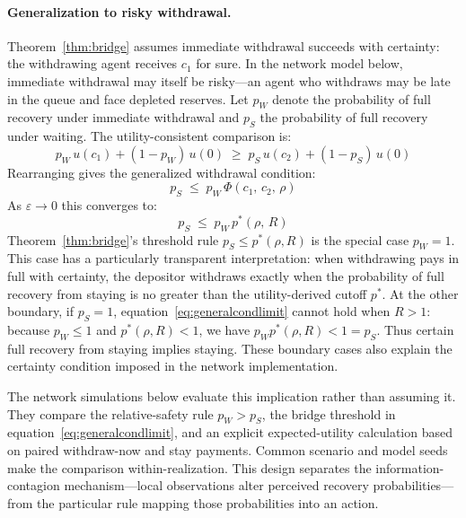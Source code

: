 \documentclass[12pt]{article}\usepackage[]{graphicx}\usepackage[]{xcolor}
\begin{document}
\paragraph{Generalization to risky withdrawal.} Theorem~\ref{thm:bridge}
assumes immediate withdrawal succeeds with certainty: the withdrawing agent receives $c_1$ for sure.
In the network model below, immediate withdrawal may itself be risky---an agent who withdraws may be late in the queue and face depleted reserves.
Let $p_W$ denote the probability of full recovery under immediate withdrawal and $p_S$ the probability of full recovery under waiting.
The utility-consistent comparison is:
%
\begin{equation}
  p_W\,u(c_1) + (1-p_W)\,u(0)
  \;\geq\;
  p_S\,u(c_2) + (1-p_S)\,u(0)
  \label{eq:generalbridge}
\end{equation}
%
Rearranging gives the generalized withdrawal condition:
%
\begin{equation}
  p_S \;\leq\; p_W\,\Phi(c_1,\,c_2,\,\rho)
  \label{eq:generalcond}
\end{equation}
%
As $\varepsilon \to 0$ this converges to:
%
\begin{equation}
  p_S \;\leq\; p_W\,p^*(\rho,\,R)
  \label{eq:generalcondlimit}
\end{equation}
%
Theorem~\ref{thm:bridge}'s threshold rule $p_S \leq p^*(\rho,R)$ is the special case $p_W = 1$.
This case has a particularly transparent interpretation: when withdrawing pays in full with certainty, the depositor withdraws exactly when the probability of full recovery from staying is no greater than the utility-derived cutoff $p^*$.
At the other boundary, if $p_S=1$, equation~\eqref{eq:generalcondlimit} cannot hold when $R>1$: because $p_W\leq1$ and $p^*(\rho,R)<1$, we have $p_Wp^*(\rho,R)<1=p_S$.
Thus certain full recovery from staying implies staying.
These boundary cases also explain the certainty condition imposed in the network implementation.

The network simulations below evaluate this implication rather than assuming it.
They compare the relative-safety rule $p_W>p_S$, the bridge threshold in equation~\eqref{eq:generalcondlimit}, and an explicit expected-utility calculation based on paired withdraw-now and stay payments.
Common scenario and model seeds make the comparison within-realization.
This design separates the information-contagion mechanism---local observations alter perceived recovery probabilities---from the particular rule mapping those probabilities into an action.
\end{document}
